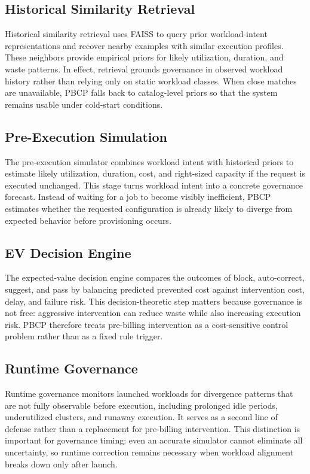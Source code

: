 \subsection{Historical Similarity Retrieval}

Historical similarity retrieval uses FAISS \cite{faiss2024} to query prior workload-intent
representations and recover nearby examples with similar execution profiles.
These neighbors provide empirical priors for likely utilization, duration, and
waste patterns. In effect, retrieval grounds governance in observed workload
history rather than relying only on static workload classes. When close matches
are unavailable, PBCP falls back to catalog-level priors so that the system
remains usable under cold-start conditions.

\subsection{Pre-Execution Simulation}

The pre-execution simulator combines workload intent with historical priors to
estimate likely utilization, duration, cost, and right-sized capacity if the
request is executed unchanged. This stage turns workload intent into a concrete
governance forecast. Instead of waiting for a job to become visibly inefficient,
PBCP estimates whether the requested configuration is already likely to diverge
from expected behavior before provisioning occurs.

\subsection{EV Decision Engine}

The expected-value decision engine compares the outcomes of
block, auto-correct, suggest, and pass by
balancing predicted prevented cost against intervention cost, delay, and failure
risk. This decision-theoretic step matters because governance is not free:
aggressive intervention can reduce waste while also increasing execution risk.
PBCP therefore treats pre-billing intervention as a cost-sensitive control
problem rather than as a fixed rule trigger.

\subsection{Runtime Governance}

Runtime governance monitors launched workloads for divergence patterns that are
not fully observable before execution, including prolonged idle periods,
underutilized clusters, and runaway execution. It serves as a second line of
defense rather than a replacement for pre-billing intervention. This distinction
is important for governance timing: even an accurate simulator cannot eliminate
all uncertainty, so runtime correction remains necessary when workload alignment
breaks down only after launch.

